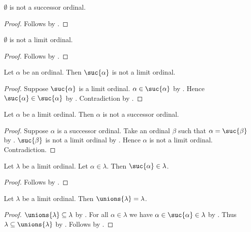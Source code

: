 \begin{lemma}\label{zero_not_successorordinal}
    $\emptyset$ is not a successor ordinal.
\end{lemma}
\begin{proof}
    Follows by .
\end{proof}

\begin{lemma}\label{zero_not_limitordinal}
    $\emptyset$ is not a limit ordinal.
\end{lemma}
\begin{proof}
    Follows by .
\end{proof}

\begin{lemma}\label{successor_ordinal_is_not_limit_ordinal}
    Let $\alpha$ be an ordinal.
    Then $\suc{\alpha}$ is not a limit ordinal.
\end{lemma}
\begin{proof}
    Suppose $\suc{\alpha}$ is a limit ordinal.
    $\alpha\in\suc{\alpha}$ by .
    Hence $\suc{\alpha}\in\suc{\alpha}$ by .
    Contradiction by .
\end{proof}

\begin{lemma}\label{limit_ordinal_is_not_successor_ordinal}
    Let $\alpha$ be a limit ordinal.
    Then $\alpha$ is not a successor ordinal.
\end{lemma}
\begin{proof}
    Suppose $\alpha$ is a successor ordinal.
    Take an ordinal $\beta$ such that $\alpha=\suc{\beta}$ by
        .
    $\suc{\beta}$ is not a limit ordinal by
        .
    Hence $\alpha$ is not a limit ordinal.
    Contradiction.
\end{proof}

\begin{lemma}\label{suc_elem_limitordinal}
    Let $\lambda$ be a limit ordinal.
    Let $\alpha\in\lambda$.
    Then $\suc{\alpha}\in\lambda$.
\end{lemma}
\begin{proof}
    Follows by .
\end{proof}

\begin{lemma}\label{limitordinal_eq_unions}
    Let $\lambda$ be a limit ordinal.
    Then $\unions{\lambda} = \lambda$.
\end{lemma}
\begin{proof}
    $\unions{\lambda}\subseteq\lambda$ by .
    For all $\alpha\in\lambda$ we have $\alpha\in\suc{\alpha}\in\lambda$ by .
    Thus $\lambda\subseteq\unions{\lambda}$ by .
    Follows by .
\end{proof}
